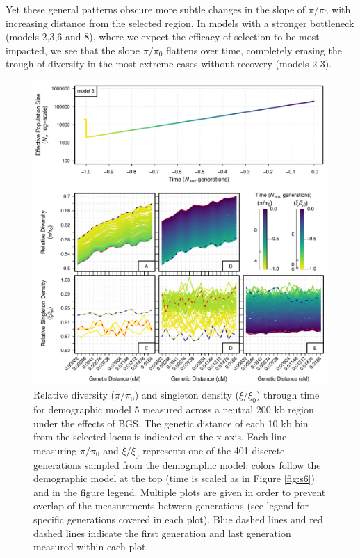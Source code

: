 \documentclass[9pt,twocolumn,twoside]{rilabRxiv}
\begin{document}
Yet these general patterns obscure more subtle changes in the slope of $\pi/\pi_0$ with increasing distance from the selected region.
In models with a stronger bottleneck (models 2,3,6 and 8), where we expect the efficacy of selection to be most impacted, we see that the slope $\pi/\pi_0$ flattens over time, completely erasing the trough of diversity in the most extreme cases without recovery (models 2-3). 





\begin{figure}[]
\includegraphics[width=\linewidth]{figures/FigS13.pdf}
\caption{Relative diversity ($\pi/\pi_0$) and singleton density ($\xi/\xi_0$) through time for demographic model 5 measured across a neutral 200 kb region under the effects of BGS.
The genetic distance of each 10 kb bin from the selected locus is indicated on the x-axis.
Each line measuring $\pi/\pi_0$ and $\xi/\xi_0$ represents one of the 401 discrete generations sampled from the demographic model; colors follow the demographic model at the top (time is scaled as in Figure \ref{fig:s6}) and in the figure legend.
Multiple plots are given in order to prevent overlap of the measurements between generations (see legend for specific generations covered in each plot).
Blue dashed lines and red dashed lines indicate the first generation and last generation measured within each plot.}
\label{fig:200kb}
\end{figure}
\end{document}

